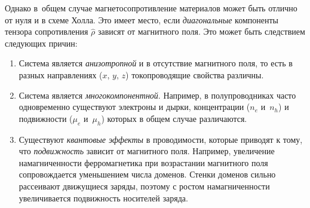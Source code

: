 Однако в~общем случае магнетосопротивление материалов может 
быть отлично от нуля и в схеме Холла. Это имеет место, если
\emph{диагональные} компоненты тензора сопротивления $\hat{\rho}$
зависят от магнитного поля. Это может быть следствием следующих причин:
\begin{enumerate}
    \item Система является \emph{анизотропной} и в отсутствие магнитного поля, то есть в разных
направлениях ($x,\,y,\,z$) токопроводящие свойства различны.

\item Система является \emph{многокомпонентной}. Например, в
полупроводниках часто одновременно существуют электроны и дырки, концентрации
($n_e$ и~$n_h$) и подвижности ($\mu_e$ и~$\mu_h$) которых в общем случае
различаются.

\item Существуют \emph{квантовые эффекты} в проводимости, которые приводят
к тому, что \emph{подвижность} зависит от магнитного поля. Например, 
увеличение намагниченности ферромагнетика при возрастании магнитного
поля сопровождается уменьшением числа доменов. Стенки доменов
сильно рассеивают движущиеся заряды, поэтому 
с ростом намагниченности увеличивается подвижность носителей заряда.
\end{enumerate}

